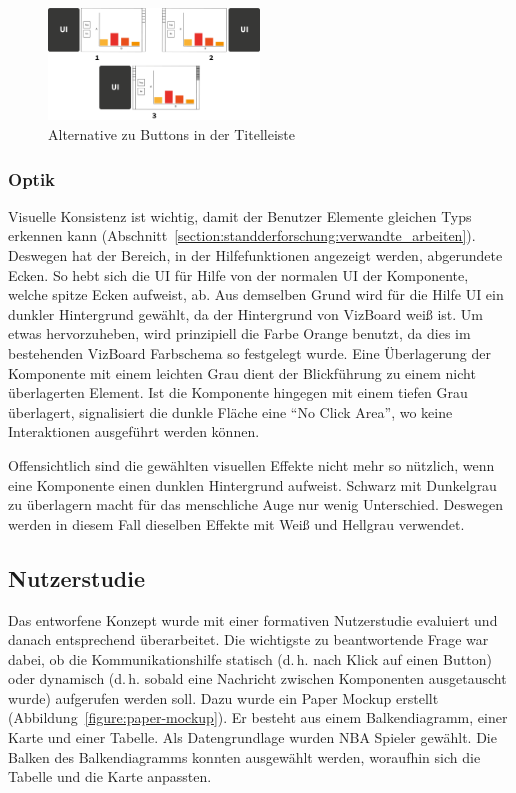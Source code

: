 \documentclass[
	headsepline,
	footsepline,
	fontsize=12pt,
	bibliography=totoc
]{scrbook}
\begin{document}
\begin{figure}[htbp]
   \centering
   \includegraphics[width=0.5\textwidth]{images/konzeption-ui-buttonleiste.png}
   \caption{Alternative zu Buttons in der Titelleiste}
   \label{figure:ui-buttonleiste}
\end{figure}

\subsubsection{Optik}

Visuelle Konsistenz ist wichtig, damit der Benutzer Elemente gleichen Typs erkennen kann (Abschnitt~\ref{section:standderforschung:verwandte_arbeiten}). Deswegen hat der Bereich, in der Hilfefunktionen angezeigt werden, abgerundete Ecken. So hebt sich die UI für Hilfe von der normalen UI der Komponente, welche spitze Ecken aufweist, ab. Aus demselben Grund wird für die Hilfe UI ein dunkler Hintergrund gewählt, da der Hintergrund von VizBoard weiß ist. Um etwas hervorzuheben, wird prinzipiell die Farbe Orange benutzt, da dies im bestehenden VizBoard Farbschema so festgelegt wurde. Eine Überlagerung der Komponente mit einem leichten Grau dient der Blickführung zu einem nicht überlagerten Element. Ist die Komponente hingegen mit einem tiefen Grau überlagert, signalisiert die dunkle Fläche eine \enquote{No Click Area}, wo keine Interaktionen ausgeführt werden können. 

Offensichtlich sind die gewählten visuellen Effekte nicht mehr so nützlich, wenn eine Komponente einen dunklen Hintergrund aufweist. Schwarz mit Dunkelgrau zu überlagern macht für das menschliche Auge nur wenig Unterschied. Deswegen werden in diesem Fall dieselben Effekte mit Weiß und Hellgrau verwendet.

\subsection{Nutzerstudie}

Das entworfene Konzept wurde mit einer formativen Nutzerstudie evaluiert und danach entsprechend überarbeitet. Die wichtigste zu beantwortende Frage war dabei, ob die Kommunikationshilfe statisch (d.\,h. nach Klick auf einen Button) oder dynamisch (d.\,h. sobald eine Nachricht zwischen Komponenten ausgetauscht wurde) aufgerufen werden soll. Dazu wurde ein Paper Mockup \cite{Virzi1996} erstellt (Abbildung~\ref{figure:paper-mockup}). Er besteht aus einem Balkendiagramm, einer Karte und einer Tabelle. Als Datengrundlage wurden NBA Spieler gewählt. Die Balken des Balkendiagramms konnten ausgewählt werden, woraufhin sich die Tabelle und die Karte anpassten.
\end{document}
